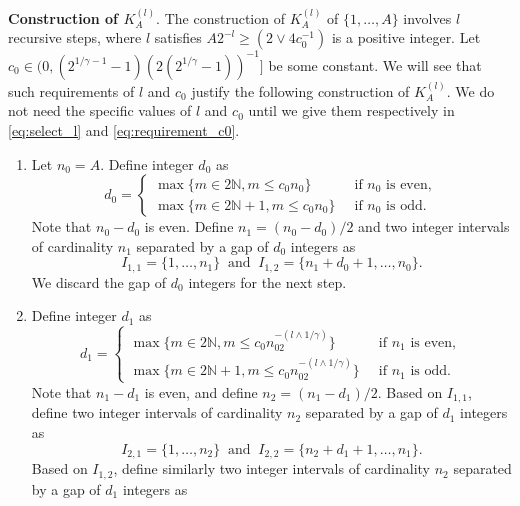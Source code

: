\documentclass[11pt]{article}
\theoremstyle{plain}
\theoremstyle{definition}
\begin{document}
\textbf{Construction of $K_A^{(l)}$}.
The construction of $K_A^{(l)}$ of $\{1, \dots, A\}$ involves $l$ recursive steps, where $l$ satisfies $A2^{-l} \geq (2 \vee 4c_0^{-1})$ is a positive integer. Let $c_0 \in (0, (2^{1/\gamma-1}-1)(2(2^{1/\gamma}-1))^{-1}]$ be some constant. We will see that such requirements of $l$ and $c_0$ justify the following construction of $K_A^{(l)}$. We do not need the specific values of $l$ and $c_0$ until we give them respectively in \eqref{eq:select_l} and \eqref{eq:requirement_c0}.
\begin{enumerate}
    \item[Step C$1$.] Let $n_0 = A$. Define integer $d_0$ as
    \begin{equation*}
        d_0 = \begin{cases}
            \max\{m \in 2\mathbb{N}, m \leq c_0n_0\} \;\; &\text{if $n_0$ is even},\\
            \max\{m \in 2\mathbb{N}+1, m \leq c_0n_0\} \;\; &\text{if $n_0$ is odd}.
        \end{cases}
    \end{equation*}
    Note that $n_0 - d_0$ is even. Define $n_1 = (n_0 - d_0)/2$ and two integer intervals of cardinality $n_1$ separated by a gap of $d_0$ integers as
    \begin{equation*}
        I_{1,1} = \{1, \dots, n_1\} \;\; \text{and} \;\; I_{1,2} = \{n_1+d_0+1, \dots, n_0\}.
    \end{equation*}
    We discard the gap of $d_0$ integers for the next step.
    \item[Step C$2$.] Define integer $d_1$ as
    \begin{equation*}
        d_1 = \begin{cases}
            \max\{m \in 2\mathbb{N}, m \leq c_0n_02^{-(l \wedge 1/\gamma)}\} \;\; &\text{if $n_1$ is even},\\
            \max\{m \in 2\mathbb{N}+1, m \leq c_0n_02^{-(l \wedge 1/\gamma)}\} \;\; &\text{if $n_1$ is odd}.
        \end{cases}
    \end{equation*}
    Note that $n_1 - d_1$ is even, and define $n_2 = (n_1 - d_1)/2$. Based on $I_{1,1}$, define two integer intervals of cardinality $n_2$ separated by a gap of $d_1$ integers as
    \begin{equation*}
        I_{2,1} = \{1, \dots, n_2\} \;\; \text{and} \;\; I_{2,2} = \{n_2+d_1+1, \dots, n_1\}.
    \end{equation*}
    Based on $I_{1,2}$, define similarly two integer intervals of cardinality $n_2$ separated by a gap of $d_1$ integers as

\end{enumerate}
\end{document}
